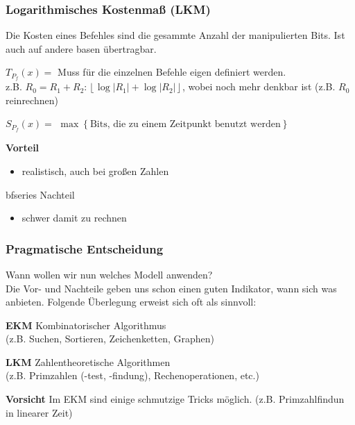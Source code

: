\subsubsection{Logarithmisches Kostenmaß (LKM)}

Die Kosten eines Befehles sind die gesammte Anzahl der manipulierten Bits. Ist auch auf andere basen übertragbar.

\begin{description}

\item{$T_{P_f}(x) = $} Muss für die einzelnen Befehle eigen definiert werden.\\
z.B. $R_0 = R_1 + R_2 : \left\lfloor \log | R_1 | + \log | R_2 | \right\rfloor $, wobei noch mehr denkbar ist (z.B. $R_0$ reinrechnen)

\item{$S_{P_f}(x) =$} $\max \left\{ \text{Bits, die zu einem Zeitpunkt benutzt werden} \right\}$

\item{\bfseries Vorteil}

\begin{itemize}[-]

\item realistisch, auch bei großen Zahlen

\end{itemize}

\item{bfseries Nachteil}

\begin{itemize}[-]

\item schwer damit zu rechnen

\end{itemize}

\end{description}

\subsubsection{Pragmatische Entscheidung}

Wann wollen wir nun welches Modell anwenden?\\
Die Vor- und Nachteile geben uns schon einen guten Indikator, wann sich was anbieten. Folgende Überlegung erweist sich oft als sinnvoll:

\begin{description}

\item{\bfseries EKM} Kombinatorischer Algorithmus \\
(z.B. Suchen, Sortieren, Zeichenketten, Graphen)

\item{\bfseries LKM} Zahlentheoretische Algorithmen \\
(z.B. Primzahlen (-test, -findung), Rechenoperationen, etc.)

\item{\bfseries Vorsicht} Im EKM sind einige schmutzige Tricks möglich. (z.B. Primzahlfindun in linearer Zeit)

\end{description}

